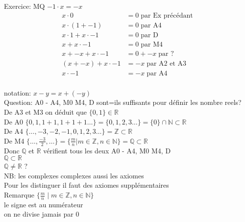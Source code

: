 \documentclass{article}
\newcommand{\reals}{\mathbb{R}}
\newcommand{\naturals}{\mathbb{N}}
\newcommand{\rationals}{\mathbb{Q}}
\begin{document}
Exercice: MQ $-1 \cdot x = -x$ \\

\begin{equation}
\begin{aligned}
    x \cdot 0 &= 0 \; \text{par Ex précédant} \\
    x \cdot (1 + -1) &= 0 \; \text{par A4} \\
    x \cdot 1 + x \cdot -1 &= 0 \; \text{par D} \\
    x + x \cdot -1 &= 0 \; \text{par M4} \\
    x + -x + x \cdot -1 &= 0 + -x \; \text{par ?} \\
    (x + -x) + x \cdot -1 &= -x \; \text{par A2 et A3} \\
    x \cdot -1 &= -x \; \text{par A4} \\
\end{aligned}
\end{equation}

notation: $x - y = x + (-y)$\\
Question: A0 - A4, M0 M4, D sont=ils suffisants pour définir les nombre reels?\\
De A3 et M3 on déduit que $\{0, 1\} \in \reals$\\
De A0 $\{0, 1, 1 + 1, 1 + 1 + 1 \ldots\} = \{0, 1, 2, 3 \ldots\} = \{0\} \cap \naturals \subset \reals$ \\
De A4 $\{\ldots, -3, -2, -1, 0, 1, 2, 3 \ldots\} = \mathbb{Z} \subset \reals$ \\ 
De M4 $\{\ldots, \frac{-3}{2}, \ldots\} = \{ \frac{m}{n} | m \in \mathbb{Z} , n \in \naturals \} = \rationals \subset \reals$ \\ 

Donc $\rationals$  et $\reals$ vérifient tous les deux A0 - A4, M0 M4, D \\
$\rationals \subset \reals$\\
$\rationals \ne \reals$ ?\\

NB: les complexes complexes aussi les axiomes \\

Pour les distinguer il faut des axiomes supplémentaires \\

Remarque  $\{ \frac{m}{n} \;|\; m \in \mathbb{Z} , n \in \naturals \}$ \\
le signe  est au numérateur\\
on ne divise jamais par 0\\
\end{document}
